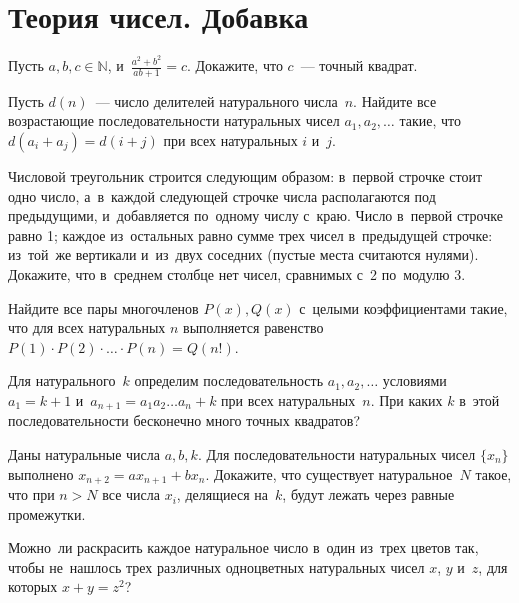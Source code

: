 
\section*{Теория чисел. Добавка}


\begin{problems}

\item
Пусть $a, b, c \in \mathbb{N}$, и~$\frac{a^2 + b^2}{a b + 1} = c$.
Докажите, что $c$~— точный квадрат.

\item
Пусть $d(n)$~— число делителей натурального числа~$n$.
Найдите все возрастающие последовательности натуральных чисел
$a_1, a_2, \ldots$ такие, что $d(a_i + a_j) = d(i + j)$ при всех натуральных
$i$ и~$j$.

\item
Числовой треугольник строится следующим образом: в~первой строчке стоит одно
число, а~в~каждой следующей строчке числа располагаются под предыдущими,
и~добавляется по~одному числу с~краю.
Число в~первой строчке равно 1;
каждое из~остальных равно сумме трех чисел в~предыдущей строчке:
из~той~же вертикали и~из~двух соседних (пустые места считаются нулями).
Докажите, что в~среднем столбце нет чисел, сравнимых с~2 по~модулю 3.

\item
Найдите все пары многочленов $P(x), Q(x)$ с~целыми коэффициентами такие, что
для всех натуральных $n$ выполняется равенство
\(
    P(1) \cdot P(2) \cdot \ldots \cdot P(n)
=
    Q(n!)
\).

\item
Для натурального~$k$ определим последовательность $a_1, a_2, \ldots$ условиями
$a_1 = k + 1$ и~$a_{n+1} = a_1 a_2 \ldots a_n + k$ при всех натуральных~$n$.
При каких $k$ в~этой последовательности бесконечно много точных квадратов?

\item
Даны натуральные числа $a, b, k$.
Для последовательности натуральных чисел $\{ x_n \}$ выполнено
$x_{n+2} = a x_{n+1} + b x_{n}$.
Докажите, что существует натуральное~$N$ такое, что при $n > N$ все
числа $x_i$, делящиеся на~$k$, будут лежать через равные промежутки.

\item
Можно~ли раскрасить каждое натуральное число в~один из~трех цветов так, чтобы
не~нашлось трех различных одноцветных натуральных чисел $x$, $y$ и~$z$, для
которых $x + y = z^2$?

\end{problems}

